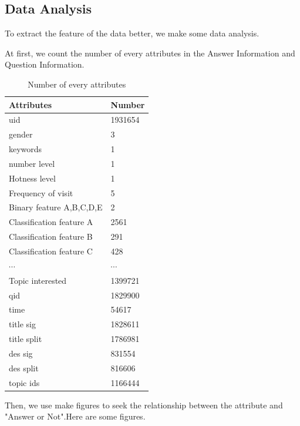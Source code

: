 \documentclass[sigconf]{acmart}
\begin{document}
\subsection{Data Analysis}

To extract the feature of the data better, we make some data analysis.

At first, we count the number of every attributes in the Answer Information and Question Information.

\begin{table}[H]
  \caption{Number of every attributes}
  \label{tab:freq}
  \begin{tabular}{ll}
    \toprule
    Attributes&Number\\
    \midrule
    uid                      & 1931654 \\
    gender                   & 3       \\
    keywords                 & 1       \\
    number level             & 1       \\
    Hotness level            & 1       \\
    Frequency of visit       & 5       \\
    Binary feature A,B,C,D,E        & 2       \\

    Classification feature A & 2561    \\
    Classification feature B & 291     \\
    Classification feature C & 428     \\
    $\cdots$ & $\cdots$ \\
    Topic interested         & 1399721 \\
    qid                      & 1829900 \\
    time                     & 54617   \\
    title sig                & 1828611 \\
    title split              & 1786981 \\
    des sig                  & 831554  \\
    des split                & 816606  \\
    topic ids                & 1166444 \\
  \bottomrule
\end{tabular}
\end{table}


Then, we use make figures to seek the relationship between the attribute and "Answer or Not".Here are some figures.
\end{document}
